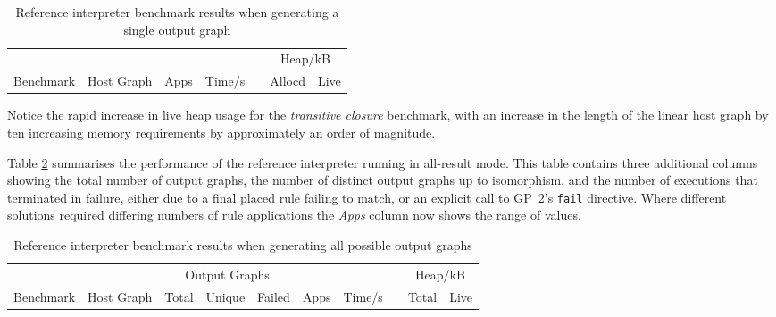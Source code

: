 \begin{table}[t]
\begin{minipage}{\textwidth}
\centering

\begin{tabular}{llrrcrr}
\hline 
&  & & & & \multicolumn{2}{c}{Heap/kB}\\
Benchmark          & Host Graph & Apps & Time/s   & & Allocd & Live \\
\hline 

\end{tabular}

\caption[Reference interpreter benchmarks]{Reference interpreter benchmark results when generating a single output graph}

\label{table:resultsSingle}
\end{minipage}
\end{table}




Notice the rapid increase in live heap usage for the \textit{transitive closure} benchmark, with an increase in the length of the linear host graph by ten increasing memory requirements by approximately an order of magnitude. %


Table \ref{table:resultsAll} summarises the performance of the reference interpreter running in all-result mode. This table contains three additional columns showing the total number of output graphs, the number of distinct output graphs up to isomorphism, and the number of executions that terminated in failure, either due to a final placed rule failing to match, or an explicit call to GP~2's \texttt{fail} directive. Where different solutions required differing numbers of rule applications the \textit{Apps} column now shows the range of values.


\begin{table}[t]
\begin{minipage}{\textwidth}
\centering

\begin{tabular}{llrrrrrcrr}
\hline 
&  & \multicolumn{3}{c}{Output Graphs} & & && \multicolumn{2}{c}{Heap/kB}\\
Benchmark          & Host Graph & Total & Unique   & Failed & Apps & Time/s   & & Total  & Live \\
\hline 

\end{tabular}

\caption[Reference interpreter benchmarks]{Reference interpreter benchmark results when generating all possible output graphs}

\label{table:resultsAll}
\end{minipage}
\end{table}

